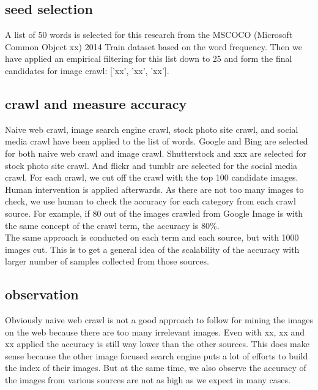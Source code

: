 \documentclass[paper=a4, fontsize=11pt]{scrartcl}
\numberwithin{equation}{section}		%
\numberwithin{figure}{section}			%
\numberwithin{table}{section}				%
\begin{document}
\subsection{seed selection}

A list of 50 words is selected for this research from the MSCOCO (Microsoft Common Object xx) 2014 Train dataset based on the word frequency. Then we have applied an empirical filtering for this list down to 25 and form the final candidates for image crawl: ['xx', 'xx', 'xx'].

\subsection{crawl and measure accuracy}

Naive web crawl, image search engine crawl, stock photo site crawl, and social media crawl have been applied to the list of words. Google and Bing are selected for both naive web crawl and image crawl. Shutterstock and xxx are selected for stock photo site crawl. And flickr and tumblr are selected for the social media crawl. For each crawl, we cut off the crawl with the top 100 candidate images. Human intervention is applied afterwards. As there are not too many images to check, we use human to check the accuracy for each category from each crawl source. For example, if 80 out of the images crawled from Google Image is with the same concept of the crawl term, the accuracy is 80\%.\\

\noindent The same approach is conducted on each term and each source, but with 1000 images cut. This is to get a general idea of the scalability of the accuracy with larger number of samples collected from those sources.

\subsection{observation}

Obviously naive web crawl is not a good approach to follow for mining the images on the web because there are too many irrelevant images. Even with xx, xx and xx applied the accuracy is still way lower than the other sources. This does make sense because the other image focused search engine puts a lot of efforts to build the index of their images. But at the same time, we also observe the accuracy of the images from various sources are not as high as we expect in many cases.\\
\end{document}
